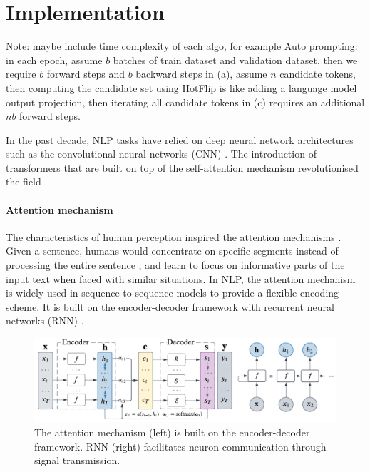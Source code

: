 \chapter{Implementation}

Note: maybe include time complexity of each algo, for example Auto prompting:  in each epoch, assume $b$ batches of train dataset and validation dataset, then we require $b$ forward steps and $b$ backward steps in (a), assume $n$ candidate tokens, then computing the candidate set using HotFlip is like adding a language model output projection, then iterating all candidate tokens in (c) requires an additional $nb$ forward steps.

In the past decade, NLP tasks have relied on deep neural network architectures such as the convolutional neural networks (CNN) \cite{Krizhevsky12CNN, He15CNN, Han19CNN}. The introduction of transformers that are built on top of the self-attention mechanism 
 revolutionised the field \cite{Vaswani17attention}.

\subsubsection{Attention mechanism}
The characteristics of human perception inspired the attention mechanisms \cite{Bahdanau14attention}. Given a sentence, humans would concentrate on specific segments instead of processing the entire sentence \cite{Niu21attention}, and learn to focus on informative parts of the input text when faced with similar situations. In NLP, the attention mechanism is widely used in sequence-to-sequence models \cite{Chorowski15attention, Chan15attention, Bahdanau15attention} to provide a flexible encoding scheme. It is built on the encoder-decoder framework with recurrent neural networks (RNN) \cite{Cho14EncDec, Sutskever14EncDec}. 

\begin{figure}[!ht]
    \centering
    \includegraphics[width=\hsize]{figures/preparation_media/prepare-attention.pdf}
    \caption{The attention mechanism (left) is built on the encoder-decoder framework. RNN (right) facilitates neuron communication through signal transmission.}
    \label{fig:prepare-attention}
\end{figure}

